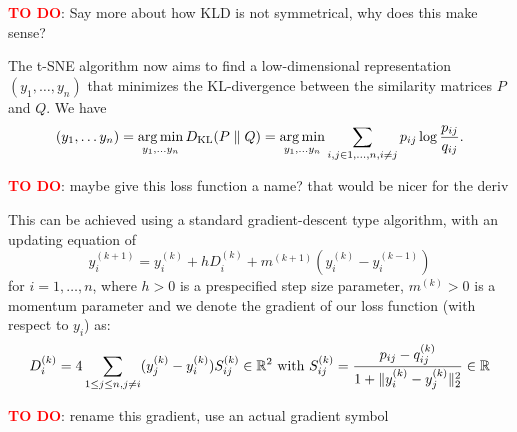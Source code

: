 \textcolor{red}{\textbf{TO DO}}: Say more about how KLD is not symmetrical, why does this make sense? 

The t-SNE algorithm now aims to find a low-dimensional representation $(y_1, \dots, y_n)$ that minimizes the KL-divergence between the similarity matrices $P$ and $Q$. We have 
\begin{equation}
    (y_1, \dots y_n) = \operatorname*{arg\,min}_{y_1, \dots y_n} D_{\text{KL}}(P \parallel Q) = \operatorname*{arg\,min}_{y_1, \dots y_n} \sum_{i,j \in {1,\dots,n}, i \neq j} p_{ij} \log \frac{p_{ij}}{q_{ij}}.
\end{equation}

\textcolor{red}{\textbf{TO DO}}: maybe give this loss function a name? that would be nicer for the deriv 

This can be achieved using a standard gradient-descent type algorithm, with an updating equation of 
\begin{equation}
    y_i^{(k+1)} = y_i^{(k)} + h D_i^{(k)} + m^{(k+1)}(y_i^{(k)} - y_i^{(k-1)}) 
\end{equation}
for $i=1,\dots,n$, where $h >0$ is a prespecified step size parameter, $m^{(k)} > 0$ is a momentum parameter and we denote the gradient of our loss function (with respect to $y_i$) as: 
\begin{equation}
    D_i^{(k)} = 4 \sum_{1 \leq j \leq n, j \neq i} (y_j^{(k)} - y_i^{(k)}) S_{ij}^{(k)} \in \mathbb{R}^2 \text{ with } S_{ij}^{(k)} = \frac{p_{ij} - q_{ij}^{(k)}}{1+ \lVert y_i^{(k)}-y_j^{(k)}\rVert_2^2 } \in \mathbb{R}
\end{equation}

\textcolor{red}{\textbf{TO DO}}: rename this gradient, use an actual gradient symbol 